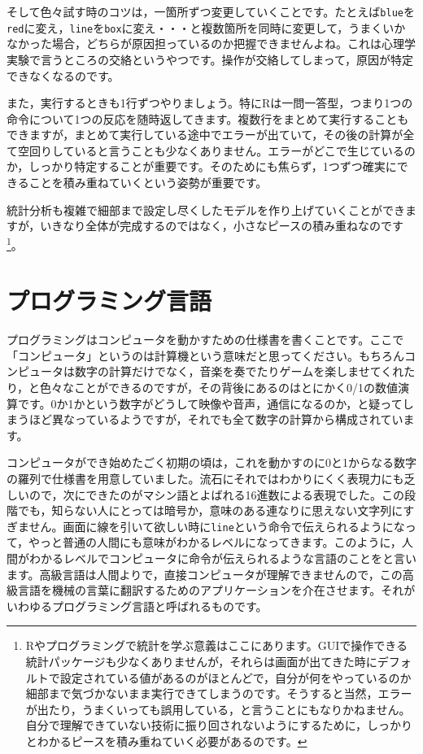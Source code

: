 \documentclass{ltjsbook}
\begin{document}
そして色々試す時のコツは，一箇所ずつ変更していくことです。たとえば\texttt{blue}を\texttt{red}に変え，\texttt{line}を\texttt{box}に変え・・・と複数箇所を同時に変更して，うまくいかなかった場合，どちらが原因担っているのか把握できませんよね。これは心理学実験で言うところの交絡というやつです。操作が交絡してしまって，原因が特定できなくなるのです。

また，実行するときも1行ずつやりましょう。特にRは一問一答型，つまり1つの命令について1つの反応を随時返してきます。複数行をまとめて実行することもできますが，まとめて実行している途中でエラーが出ていて，その後の計算が全て空回りしていると言うことも少なくありません。エラーがどこで生じているのか，しっかり特定することが重要です。そのためにも焦らず，1つずつ確実にできることを積み重ねていくという姿勢が重要です。

統計分析も複雑で細部まで設定し尽くしたモデルを作り上げていくことができますが，いきなり全体が完成するのではなく，小さなピースの積み重ねなのです\footnote{Rやプログラミングで統計を学ぶ意義はここにあります。GUIで操作できる統計パッケージも少なくありませんが，それらは画面が出てきた時にデフォルトで設定されている値があるのがほとんどで，自分が何をやっているのか細部まで気づかないまま実行できてしまうのです。そうすると当然，エラーが出たり，うまくいっても誤用している，と言うことにもなりかねません。自分で理解できていない技術に振り回されないようにするために，しっかりとわかるピースを積み重ねていく必要があるのです。}。


\section{プログラミング言語}

プログラミングはコンピュータを動かすための仕様書を書くことです。ここで「コンピュータ」というのは計算機という意味だと思ってください。もちろんコンピュータは数字の計算だけでなく，音楽を奏でたりゲームを楽しませてくれたり，と色々なことができるのですが，その背後にあるのはとにかく0/1の数値演算です。0か1かという数字がどうして映像や音声，通信になるのか，と疑ってしまうほど異なっているようですが，それでも全て数字の計算から構成されています。

コンピュータができ始めたごく初期の頃は，これを動かすのに0と1からなる数字の羅列で仕様書を用意していました。流石にそれではわかりにくく表現力にも乏しいので，次にできたのがマシン語とよばれる16進数による表現でした。この段階でも，知らない人にとっては暗号か，意味のある連なりに思えない文字列にすぎません。画面に線を引いて欲しい時に\texttt{line}という命令で伝えられるようになって，やっと普通の人間にも意味がわかるレベルになってきます。このように，人間がわかるレベルでコンピュータに命令が伝えられるような言語のことをと言います。高級言語は人間よりで，直接コンピュータが理解できませんので，この高級言語を機械の言葉に翻訳するためのアプリケーションを介在させます。それがいわゆるプログラミング言語と呼ばれるものです。
\end{document}
